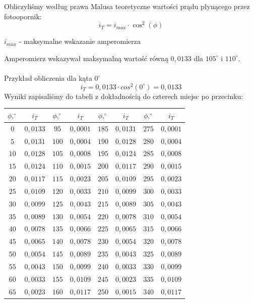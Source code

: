 \documentclass{article}
\begin{document}
Obliczyliśmy według prawa Malusa teoretyczne wartości prądu płynącego przez fotoopornik:
$$i_T = i_{max} \cdot \cos^2(\phi)$$
\begin{center} $i_{max} $ - maksymalne wskazanie amperomierza \end{center}
Amperomierz wskazywał maksymalną wartość równą $0,0133$ dla $105^{\circ}$ i  $110^{\circ}$. \\\\
Przykład obliczenia dla kąta $0^{\circ}$
$$i_T = 0,0133 \cdot cos^2(0^{\circ}) = 0,0133 $$
Wyniki zapisaliśmy do tabeli z dokładnością do czterech miejsc po przecinku:
\begin{center}
    \begin{tabular}{|c|c|c|c|c|c|c|c|}
    \hline
    $\phi , ^{\circ} $ & $i_T$ & $\phi , ^{\circ}$ & $i_T$ & $\phi , ^{\circ}$ & $i_T$ & $\phi , ^{\circ}$ & $i_T$\\ \hline
    $0$ & $0,0133$ & $95$ & $0,0001$ & $185$ & $0,0131$ & $275$ & $0,0001$\\ \hline
    $5$ & $0,0131$ & $100$ & $0,0004$ & $190$ & $0,0128$ & $280$ & $0,0004$\\ \hline
    $10$ & $0,0128$ & $105$ & $0,0008$ & $195$ & $0,0124$ & $285$ & $0,0008$\\ \hline
    $15$ & $0,0124$ & $110$ & $0,0015$ & $200$ & $0,0117$ & $290$ & $0,0015$\\ \hline
    $20$ & $0,0117$ & $115$ & $0,0023$ & $205$ & $0,0109$ & $295$ & $0,0023$\\ \hline
    $25$ & $0,0109$ & $120$ & $0,0033$ & $210$ & $0,0099$ & $300$ & $0,0033$\\ \hline
    $30$ & $0,0099$ & $125$ & $0,0043$ & $215$ & $0,0089$ & $305$ & $0,0043$\\ \hline
    $35$ & $0,0089$ & $130$ & $0,0054$ & $220$ & $0,0078$ & $310$ & $0,0054$\\ \hline
    $40$ & $0,0078$ & $135$ & $0,0066$ & $225$ & $0,0065$ & $315$ & $0,0066$\\ \hline
    $45$ & $0,0065$ & $140$ & $0,0078$ & $230$ & $0,0054$ & $320$ & $0,0078$\\ \hline
    $50$ & $0,0054$ & $145$ & $0,0089$ & $235$ & $0,0043$ & $325$ & $0,0089$\\ \hline
    $55$ & $0,0043$ & $150$ & $0,0099$ & $240$ & $0,0033$ & $330$ & $0,0099$\\ \hline
    $60$ & $0,0033$ & $155$ & $0,0109$ & $245$ & $0,0023$ & $335$ & $0,0109$\\ \hline
    $65$ & $0,0023$ & $160$ & $0,0117$ & $250$ & $0,0015$ & $340$ & $0,0117$\\ \hline

\end{tabular}
\end{center}
\end{document}
